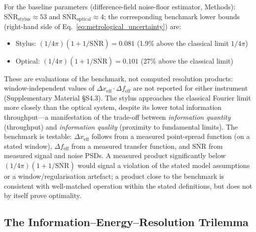 \documentclass[review,12pt]{elsarticle}
\begin{document}
For the baseline parameters (difference-field noise-floor estimator, Methods): $\overline{\mathrm{SNR}}_\mathrm{stylus} \approx 53$ and $\overline{\mathrm{SNR}}_\mathrm{optical} \approx 4$; the corresponding benchmark lower bounds (right-hand side of Eq.~\ref{eq:metrological_uncertainty}) are:
\begin{itemize}
    \item Stylus: $(1/4\pi)(1 + 1/\overline{\mathrm{SNR}}) = 0.081$ (1.9\% above the classical limit $1/4\pi$)
    \item Optical: $(1/4\pi)(1 + 1/\overline{\mathrm{SNR}}) = 0.101$ (27\% above the classical limit)
\end{itemize}
These are evaluations of the benchmark, not computed resolution products: window-independent values of $\Delta x_\mathrm{eff}\cdot\Delta f_\mathrm{eff}$ are not reported for either instrument (Supplementary Material \S S4.3).
The stylus approaches the classical Fourier limit more closely than the optical system, despite its lower total information throughput---a manifestation of the trade-off between \emph{information quantity} (throughput) and \emph{information quality} (proximity to fundamental limits). The benchmark is testable: $\Delta x_\mathrm{eff}$ follows from a measured point-spread function (on a stated window), $\Delta f_\mathrm{eff}$ from a measured transfer function, and $\overline{\mathrm{SNR}}$ from measured signal and noise PSDs. A measured product significantly below $(1/4\pi)(1 + 1/\overline{\mathrm{SNR}})$ would signal a violation of the stated model assumptions or a window/regularisation artefact; a product close to the benchmark is consistent with well-matched operation within the stated definitions, but does not by itself prove optimality.

\subsection{The Information--Energy--Resolution Trilemma}
\end{document}
